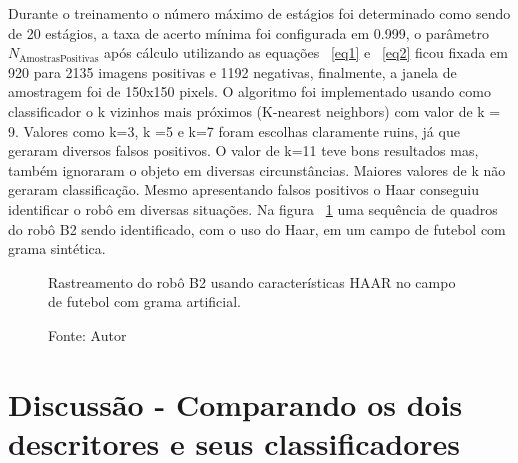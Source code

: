 Durante o treinamento o número máximo de estágios foi determinado como sendo de 20 estágios, a taxa de acerto mínima foi configurada em 0.999, o parâmetro \(N_{\text{AmostrasPositivas}}\) após cálculo utilizando as equações ~\ref{eq1} e ~\ref{eq2} ficou fixada em 920 para 2135 imagens positivas e 1192 negativas, finalmente, a janela de amostragem foi de 150x150 pixels. O algoritmo foi implementado usando como classificador o k vizinhos mais próximos (K-nearest neighbors) com valor de k = 9. Valores como k=3, k =5 e k=7 foram escolhas claramente ruins, já que geraram diversos falsos positivos. O valor de k=11 teve bons resultados mas, também ignoraram o objeto em diversas circunstâncias. Maiores valores de k não geraram classificação. Mesmo apresentando falsos positivos o Haar conseguiu identificar o robô em diversas situações. Na figura ~\ref{fig:Art} uma sequência de quadros do robô B2 sendo identificado, com o uso do Haar, em um campo de futebol com grama sintética. 

\begin{figure}[!h!t!]
    \centering \caption{Rastreamento do robô B2 usando características HAAR no campo de futebol com grama artificial.}
    \qquad
    \qquad
    \qquad
    \qquad
    \qquad
    \qquad
    \qquad
    \qquad
    \qquad
    \qquad
    \qquad
    \caption*{Fonte: Autor}
    \label{fig:Art}
\end{figure}



\section{Discussão - Comparando os dois descritores e seus classificadores} 
\label{exp:comp}

